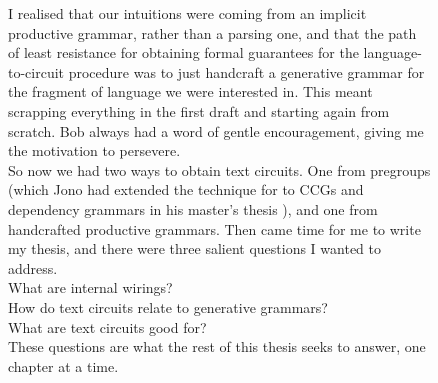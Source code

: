 \begin{figure}[h!]
\centering
{}
\caption{I realised that our intuitions were coming from an implicit productive grammar, rather than a parsing one, and that the path of least resistance for obtaining formal guarantees for the language-to-circuit procedure was to just handcraft a generative grammar for the fragment of language we were interested in. This meant scrapping everything in the first draft and starting again from scratch. Bob always had a word of gentle encouragement, giving me the motivation to persevere.\\

So now we had two ways to obtain text circuits. One from pregroups (which Jono had extended the technique for to CCGs and dependency grammars in his master's thesis \citep{liu_language_2021}), and one from handcrafted productive grammars. Then came time for me to write my thesis, and there were three salient questions I wanted to address.\\
What are internal wirings?\\
How do text circuits relate to generative grammars?\\
What are text circuits good for?\\
These questions are what the rest of this thesis seeks to answer, one chapter at a time.
}
\end{figure}